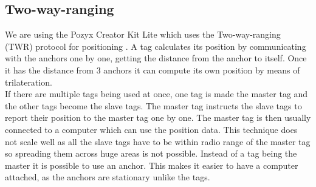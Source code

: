 \subsection{Two-way-ranging}
We are using the Pozyx Creator Kit Lite which uses the Two-way-ranging (TWR) protocol for positioning \cite{pozyx-Positioning}.
A tag calculates its position by communicating with the anchors one by one, getting the distance from the anchor to itself.
Once it has the distance from 3 anchors it can compute its own position by means of trilateration.
\\
If there are multiple tags being used at once, one tag is made the master tag and the other tags become the slave tags.
The master tag instructs the slave tags to report their position to the master tag one by one.
The master tag is then usually connected to a computer which can use the position data.
This technique does not scale well as all the slave tags have to be within radio range of the master tag so spreading them across huge areas is not possible.
Instead of a tag being the master it is possible to use an anchor.
This makes it easier to have a computer attached, as the anchors are stationary unlike the tags.
